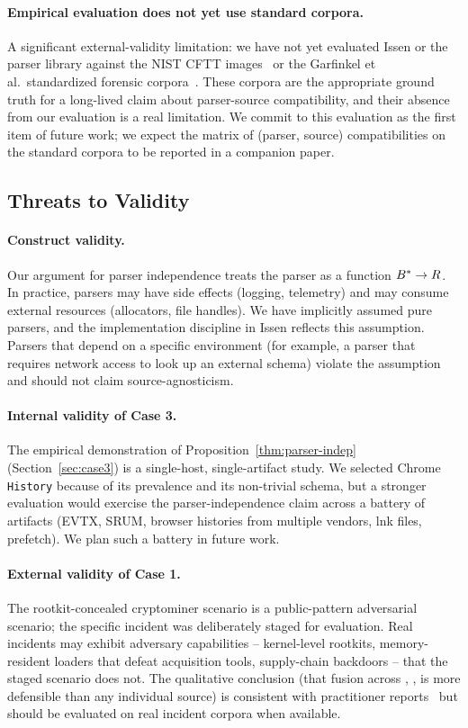 \paragraph{Empirical evaluation does not yet use standard corpora.} A
significant external-validity limitation: we have not yet evaluated Issen
or the parser library against the NIST CFTT
images~\cite{nistcftt} or the
Garfinkel et al.\ standardized forensic corpora~\cite{garfinkel2009corpora}.
These corpora are the appropriate ground truth for a long-lived claim
about parser-source compatibility, and their absence from our evaluation
is a real limitation. We commit to this evaluation as the first item of
future work; we expect the matrix of (parser, source) compatibilities on
the standard corpora to be reported in a companion paper.

\subsection{Threats to Validity}

\paragraph{Construct validity.} Our argument for parser independence treats
the parser as a function $B^{*} \to R$. In practice, parsers may have
side effects (logging, telemetry) and may consume external resources
(allocators, file handles). We have implicitly assumed pure parsers, and
the implementation discipline in Issen reflects this assumption. Parsers
that depend on a specific environment (for example, a parser that requires
network access to look up an external schema) violate the assumption and
should not claim source-agnosticism.

\paragraph{Internal validity of Case 3.} The empirical demonstration of
Proposition~\ref{thm:parser-indep} (Section~\ref{sec:case3}) is a single-host,
single-artifact study. We selected Chrome \texttt{History} because of its
prevalence and its non-trivial schema, but a stronger evaluation would
exercise the parser-independence claim across a battery of artifacts (EVTX,
SRUM, browser histories from multiple vendors, lnk files, prefetch). We
plan such a battery in future work.

\paragraph{External validity of Case 1.} The rootkit-concealed cryptominer
scenario is a public-pattern adversarial scenario; the specific incident
was deliberately staged for evaluation. Real incidents may exhibit
adversary capabilities -- kernel-level rootkits, memory-resident loaders
that defeat acquisition tools, supply-chain backdoors -- that the staged
scenario does not. The qualitative conclusion (that fusion across ,
,  is more defensible than any individual source) is
consistent with practitioner reports~\cite{cohen2011distributed,case2017memory}
but should be evaluated on real incident corpora when available.

